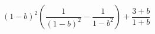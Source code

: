 \begin{ex}[type=simplify_calculate]
	\begin{condition}
		\((1-b)^2\left( \dfrac{1}{(1-b)^2}-\dfrac{1}{1-b^2} \right)+\dfrac{3+b}{1+b}\)
	\end{condition}
\end{ex}